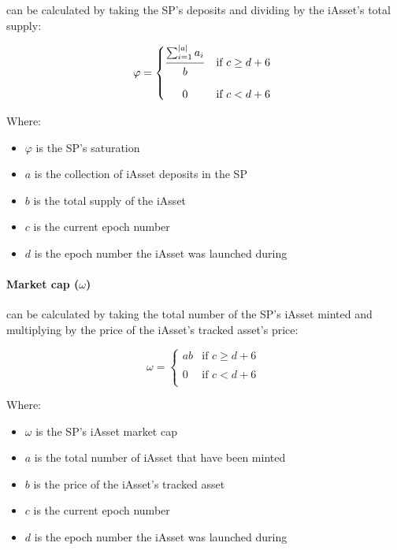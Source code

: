 \documentclass{article}
\begin{document}
\begin{sloppypar}
can be calculated by taking the SP's deposits and dividing by the
iAsset's total supply:

\[\varphi = \left\{ \begin{matrix}
  \genfrac{}{}{}{}{\raisebox{5pt}{$\sum_{i = 1}^{\left| a \right|}a_{i}$}}{\raisebox{-5pt}{$b$}} & \text{if\ }c \geq d + 6 \\ \\
  0 & \text{if\ }c < d + 6 \\
  \end{matrix} \right.\ \]

Where:

\begin{itemize}
\item
  \(\varphi\) is the SP's saturation
\item
  \(a\) is the collection of iAsset deposits in the SP
\item
  \(b\) is the total supply of the iAsset
\item
  \(c\) is the current epoch number
\item
  \(d\) is the epoch number the iAsset was launched during
\end{itemize}

\filbreak

\hypertarget{market-cap-omega}{%
\paragraph{\texorpdfstring{Market cap
(\(\omega\))}{Market cap (\textbackslash omega)}}\label{market-cap-omega}}

can be calculated by taking the total number of the SP's iAsset minted
and multiplying by the price of the iAsset's tracked asset's price:

\[\omega = \left\{ \begin{matrix}
  ab & \text{if\ }c \geq d + 6 \\ \\
  0 & \text{if\ }c < d + 6 \\
  \end{matrix} \right.\ \]

Where:

\begin{itemize}
\item
  \(\omega\) is the SP's iAsset market cap
\item
  \(a\) is the total number of iAsset that have been minted
\item
  \(b\) is the price of the iAsset's tracked asset
\item
  \(c\) is the current epoch number
\item
  \(d\) is the epoch number the iAsset was launched during
\end{itemize}


\end{sloppypar}
\end{document}
